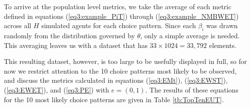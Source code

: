 \documentclass[../main.tex]{subfiles}
\begin{document}
\addtocounter{footnote}{-1}

To arrive at the population level metrics, we take the average of each metric defined in equations (\ref{eq3:example_PiT}) through (\ref{eq3:example_NMBWET}) across all $H$ simulated agents for each choice pattern.
Since each $\beta_i$ was drawn randomly from the distribution governed by $\theta$, only a simple average is needed.
This averaging leaves us with a dataset that has $33 \times 1024 = 33,792$ elements.

This resulting dataset, however, is too large to be usefully displayed in full, so for now we restrict attention to the 10 choice patterns most likely to be observed, and discuss the metrics calculated in equations (\ref{eq3:EMt}), (\ref{eq3:EWST}), (\ref{eq3:EWET}), and (\ref{eq3:PE}) with $e = (0,1)$.
The results of these equations for the 10 most likely choice patterns are given in Table \ref{tb:TopTenEUT}.
\end{document}

